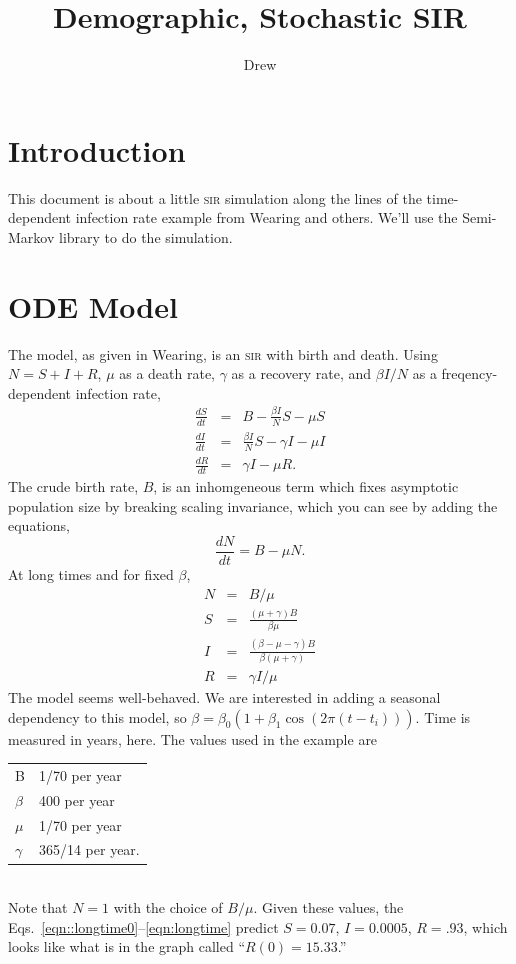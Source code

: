 \documentclass{article}
\title{Demographic, Stochastic SIR}
\author{Drew}
\newcommand{\sir}{\textsc{sir}\xspace}
\begin{document}
\maketitle

\section{Introduction}
This document is about a little \sir simulation along the lines of the
time-dependent infection rate example from Wearing and others\cite{Wearing2012}.
We'll use the Semi-Markov library\cite{SemiMarkov2014} to do the simulation.

\section{ODE Model}
The model, as given in Wearing, is an \sir with birth and death.
Using $N=S+I+R$, $\mu$ as a death rate, $\gamma$ as a recovery rate,
and $\beta I/N$ as a freqency-dependent infection rate,
\begin{eqnarray}
  \frac{dS}{dt}&=& B - \frac{\beta I}{N}S-\mu S \\
  \frac{dI}{dt}&=& \frac{\beta I}{N}S-\gamma I-\mu I \\
  \frac{dR}{dt}&=& \gamma I - \mu R.
\end{eqnarray}
The crude birth rate, $B$, is an inhomgeneous term which fixes
asymptotic population size by breaking
scaling invariance, which you can see by adding the equations,
\begin{equation}
  \frac{dN}{dt}=B-\mu N.
\end{equation}
At long times and for fixed $\beta$,
\begin{eqnarray}
  N & = & B/\mu \label{eqn::longtime0}\\
  S & = & \frac{(\mu+\gamma)B}{\beta \mu} \\
  I & = & \frac{(\beta-\mu-\gamma)B}{\beta(\mu+\gamma)} \\
  R & = & \gamma I/\mu\label{eqn:longtime}
\end{eqnarray}
The model seems well-behaved. We are interested in adding a seasonal
dependency to this model, so $\beta=\beta_0(1+\beta_1 \cos(2\pi (t-t_i))).$
Time is measured in years, here. The values used in the example
are \\
\begin{tabular}{ll}
B & 1/70 per year \\
$\beta$ & 400 per year \\
$\mu$ & 1/70 per year \\
$\gamma$ & 365/14 per year.
\end{tabular} \\
Note that $N=1$ with the choice of $B/\mu$. Given these values, the
Eqs.~\ref{eqn::longtime0}--\ref{eqn:longtime} predict
$S=0.07$, $I=0.0005$, $R=.93$, which looks like what is in the graph
called ``$R(0)=15.33$.''
\end{document}
